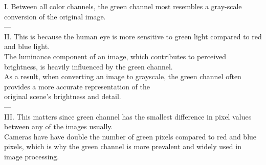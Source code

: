 I. Between all color channels, the green channel most resembles a gray-scale conversion of the original image. \\

---\\

II. This is because the human eye is more sensitive to green light compared to red and blue light. \\
The luminance component of an image, which contributes to perceived brightness, is heavily influenced by the green channel. \\
As a result, when converting an image to grayscale, the green channel often provides a more accurate representation of the \\
original scene's brightness and detail.\\

---\\

III. This matters since green channel has the smallest difference in pixel values between any of the images usually. \\
Cameras have have double the number of green pixels compared to red and blue pixels, which is why the green channel is more prevalent and widely used in image processing.